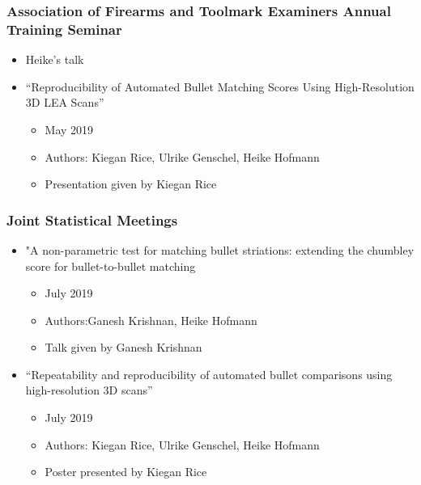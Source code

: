 \documentclass[]{book}
\providecommand{\tightlist}{%
  \setlength{\itemsep}{0pt}\setlength{\parskip}{0pt}}
\begin{document}
\hypertarget{association-of-firearms-and-toolmark-examiners-annual-training-seminar}{%
\subsubsection{Association of Firearms and Toolmark Examiners Annual Training Seminar}\label{association-of-firearms-and-toolmark-examiners-annual-training-seminar}}

\begin{itemize}
\item
  Heike's talk
\item
  ``Reproducibility of Automated Bullet Matching Scores Using High-Resolution 3D LEA Scans''

  \begin{itemize}
  \tightlist
  \item
    May 2019
  \item
    Authors: Kiegan Rice, Ulrike Genschel, Heike Hofmann
  \item
    Presentation given by Kiegan Rice
  \end{itemize}
\end{itemize}

\hypertarget{joint-statistical-meetings}{%
\subsubsection{Joint Statistical Meetings}\label{joint-statistical-meetings}}

\begin{itemize}
\item
  "A non-parametric test for matching bullet striations: extending the chumbley score for bullet-to-bullet matching

  \begin{itemize}
  \tightlist
  \item
    July 2019
  \item
    Authors:Ganesh Krishnan, Heike Hofmann
  \item
    Talk given by Ganesh Krishnan
  \end{itemize}
\item
  ``Repeatability and reproducibility of automated bullet comparisons using high-resolution 3D scans''

  \begin{itemize}
  \tightlist
  \item
    July 2019
  \item
    Authors: Kiegan Rice, Ulrike Genschel, Heike Hofmann
  \item
    Poster presented by Kiegan Rice
  \end{itemize}
\end{itemize}
\end{document}
